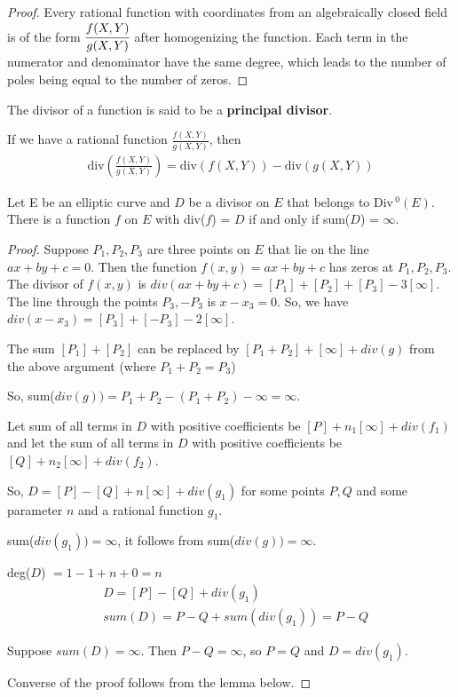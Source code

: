 \begin{proof}
    Every rational function with coordinates from an algebraically closed field is of the form $\cfrac{f(X, Y)}{g(X, Y)}$ after homogenizing the function. Each term in the numerator and denominator have the same degree, which leads to the number of poles being equal to the number of zeros. 
\end{proof}

The divisor of a function is said to be a \textbf{principal divisor}. 

If we have a rational function $\frac{f(X, Y)}{g(X, Y)}$, then 
\begin{align*}
	\text{div} \left( \frac{f(X, Y)}{g(X, Y)} \right) = \text{div} (f(X, Y)) - \text{div} (g(X, Y))
\end{align*}

\begin{theorem}
\label{div_existence}
	Let E be an elliptic curve and $D$ be a divisor on $E$ that belongs to Div\,$^0(E)$. There is a function $f$ on $E$ with div($f$) = $D$ if and only if sum($D$) = $\infty$.
\end{theorem}

\begin{proof}

Suppose $P_1, P_2, P_3$ are three points on $E$ that lie on the line $ax + by + c = 0$. Then the function $f(x, y) = ax + by + c$ has zeros at $P_1, P_2, P_3$. The divisor of $f(x, y)$ is $div(ax + by + c) = [P_1] + [P_2] + [P_3] - 3[\infty]$. The line through the points $P_3, -P_3$ is $x - x_3 = 0$. So, we have $div(x-x_3) = [P_3] + [-P_3] - 2[\infty]$.

The sum $[P_1] + [P_2]$ can be replaced by $[P_1 + P_2] + [\infty] + div(g)$ from the above argument (where $P_1 + P_2 = P_3$) 

So, sum($div(g)) = P_1 + P_2 - (P_1 + P_2) - \infty = \infty$.

Let sum of all terms in $D$ with positive coefficients be $[P] + n_1 [\infty] + div(f_1)$ and let the sum of all terms in $D$ with positive coefficients be $[Q] + n_2 [\infty] + div(f_2)$.

So, $D = [P] - [Q] + n[\infty] + div(g_1)$ for some points $P, Q$ and some parameter $n$ and a rational function $g_1$.

sum($div(g_1)) = \infty$, it follows from sum($div(g)) = \infty$.

deg($D$) $ = 1 - 1 + n + 0 = n$
\begin{align*}
&D = [P] - [Q] + div(g_1) \\
&sum(D) = P - Q + sum(div(g_1)) = P - Q 
\end{align*}

Suppose $sum(D) = \infty$. Then $P - Q = \infty$, so $P = Q$ and $D = div(g_1)$.

Converse of the proof follows from the lemma below. 
\end{proof}

